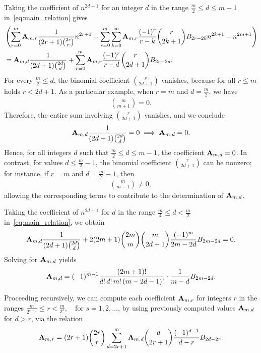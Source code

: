 Taking the coefficient of $n^{2d+1}$ for an integer $d$ in the range $\frac{m}{2} \leq d \leq m-1$ in~\eqref{eq:main_relation} gives
\begin{align*}
[n^{2d+1}]
    &\left( \sum_{r=0}^{m} \coeffA{m}{r} \frac{1}{(2r+1) \binom{2r}{r}} n^{2r+1} + \sum_{r=0}^{m} \sum_{k=0}^{\infty} \coeffA{m}{r} \frac{(-1)^r}{r-k} \binom{r}{2k+1} \bernoulli{2r-2k} n^{2k+1} - n^{2m+1} \right) \\
    &= \coeffA{m}{d} \frac{1}{(2d+1) \binom{2d}{d}} + \sum_{r=0}^m \coeffA{m}{r} \frac{(-1)^r}{r-d} \binom{r}{2d+1} \bernoulli{2r-2d}.
\end{align*}
For every $\frac{m}{2} \leq d$, the binomial coefficient $\binom{r}{2d+1}$ vanishes, because for all $r \leq m$
holds $r < 2d+1$.
As a particular example, when $r = m$ and $d = \frac{m}{2}$, we have
\begin{align*}
    \binom{m}{m+1} = 0.
\end{align*}
Therefore, the entire sum involving $\binom{r}{2d+1}$ vanishes, and we conclude
\begin{align*}
    {\mathbf{A}} \sb{m,d} \frac{1}{(2d+1) \binom{2d}{d}} = 0 \implies {\mathbf{A}} \sb{m,d} = 0.
\end{align*}
Hence, for all integers $d$ such that $\frac{m}{2} \leq d \leq m-1$, the coefficient ${\mathbf{A}} \sb{m,d} = 0$.
In contrast, for values $d \leq \frac{m}{2} - 1$, the binomial coefficient $\binom{r}{2d+1}$ can be nonzero; for instance, if $r = m$ and $d = \frac{m}{2} - 1$, then
\begin{align*}
    \binom{m}{m - 1} \neq 0,
\end{align*}
allowing the corresponding terms to contribute to the determination of ${\mathbf{A}} \sb{m,d}$.

Taking the coefficient of $n^{2d+1}$ for $d$ in the range $\frac{m}{4} \leq d < \frac{m}{2}$ in~\eqref{eq:main_relation}, we obtain
\begin{align*}
    {\mathbf{A}} \sb{m,d} \frac{1}{(2d+1) \binom{2d}{d}}
    + 2 (2m+1) \binom{2m}{m} \binom{m}{2d+1} \frac{(-1)^m}{2m - 2d} {B}\sb{2m - 2d} = 0.
\end{align*}
Solving for ${\mathbf{A}} \sb{m,d}$ yields
\begin{equation*}
    {\mathbf{A}} \sb{m,d}
    = (-1)^{m-1} \frac{(2m+1)!}{d! \, d! \, m! \, (m - 2d - 1)!} \cdot \frac{1}{m - d} {B}\sb{2m - 2d}.
\end{equation*}

Proceeding recursively, we can compute each coefficient ${\mathbf{A}} \sb{m,r}$ for integers $r$ in the ranges
$\frac{m}{2^{s+1}} \leq r < \frac{m}{2^s}, \quad \text{for } s = 1, 2, \ldots$,
by using previously computed values ${\mathbf{A}} \sb{m,d}$ for $d > r$, via the relation
\begin{equation*}
    {\mathbf{A}} \sb{m,r} =
    (2r+1) \binom{2r}{r} \sum_{d = 2r+1}^{m}
    {\mathbf{A}} \sb{m,d} \binom{d}{2r+1} \frac{(-1)^{d-1}}{d - r} {B}\sb{2d - 2r}.
\end{equation*}


